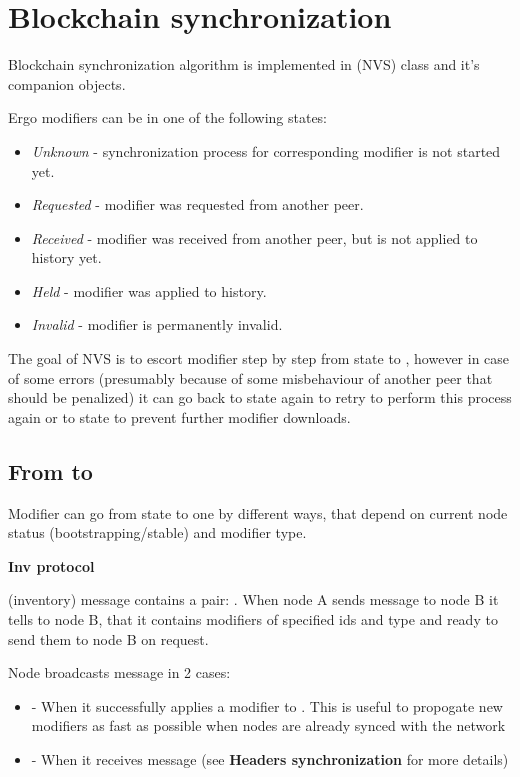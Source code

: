 
\section{Blockchain synchronization}

Blockchain synchronization algorithm is implemented in (NVS) class and it's companion objects.


Ergo modifiers can be in one of the following states:

\begin{itemize}
    \item{\em Unknown} - synchronization process for corresponding modifier is not started yet.
    \item{\em Requested} - modifier was requested from another peer.
    \item{\em Received} - modifier was received from another peer, but is not applied to history yet.
    \item{\em Held} - modifier was applied to history.
    \item{\em Invalid} - modifier is permanently invalid.
\end{itemize}

The goal of NVS is to escort modifier step by step from  state to ,
however in case of some errors (presumably because of some misbehaviour of another
peer that should be penalized) it can go back to  state again to retry to
perform this process again or to  state to prevent further modifier downloads.

\subsection{From  to }

Modifier can go from  state to  one by different ways, that depend on
current node status (bootstrapping/stable) and modifier type.

\textbf{Inv protocol}

 (inventory) message contains a pair: . When node A sends  message
to node B it tells to node B, that it contains modifiers of specified ids and type and ready to send them to
node B on request.

Node broadcasts  message in 2 cases:
\begin{itemize}
    \item - When it successfully applies a modifier to . This is useful to propogate new modifiers
    as fast as possible when nodes are already synced with the network
    \item - When it receives  message (see \textbf{Headers synchronization} for more details)
\end{itemize}

